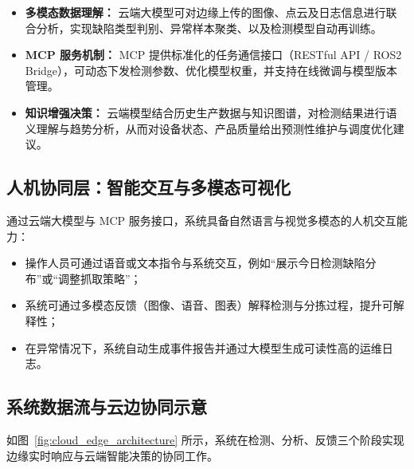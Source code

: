 \documentclass{cumcmthesis}
\begin{document}
\begin{itemize}
    \item \textbf{多模态数据理解：}  
    云端大模型可对边缘上传的图像、点云及日志信息进行联合分析，实现缺陷类型判别、异常样本聚类、以及检测模型自动再训练。

    \item \textbf{MCP 服务机制：}  
    MCP 提供标准化的任务通信接口（RESTful API / ROS2 Bridge），可动态下发检测参数、优化模型权重，并支持在线微调与模型版本管理。

    \item \textbf{知识增强决策：}  
    云端模型结合历史生产数据与知识图谱，对检测结果进行语义理解与趋势分析，从而对设备状态、产品质量给出预测性维护与调度优化建议。
\end{itemize}

\subsection{人机协同层：智能交互与多模态可视化}

通过云端大模型与 MCP 服务接口，系统具备自然语言与视觉多模态的人机交互能力：

\begin{itemize}
    \item 操作人员可通过语音或文本指令与系统交互，例如“展示今日检测缺陷分布”或“调整抓取策略”；
    \item 系统可通过多模态反馈（图像、语音、图表）解释检测与分拣过程，提升可解释性；
    \item 在异常情况下，系统自动生成事件报告并通过大模型生成可读性高的运维日志。
\end{itemize}

\subsection{系统数据流与云边协同示意}

如图~\ref{fig:cloud_edge_architecture} 所示，系统在检测、分析、反馈三个阶段实现边缘实时响应与云端智能决策的协同工作。
\end{document}
